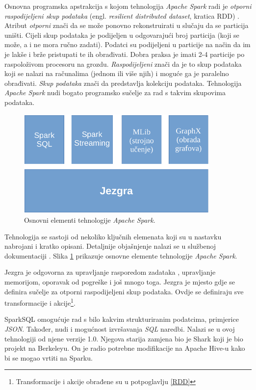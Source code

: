 \documentclass[times, utf8, zavrsni, numeric]{fer}
\begin{document}
Osnovna programska apstrakcija s kojom tehnologija \emph{Apache Spark} radi je \emph{otporni raspodijeljeni skup podataka} (engl. \emph{resilient distributed dataset}, kratica RDD) \cite{workingSets}.
Atribut \emph{otporni} znači da se može ponovno rekonstruirati u slučaju da se particija uništi. Cijeli skup podataka je podijeljen u odgovarajući broj particija (koji se može, a i ne mora ručno zadati). Podatci su podijeljeni u particije na način da im je lakše i brže pristupati te ih obrađivati. Dobra praksa je imati 2-4 particije po raspoloživom procesoru na grozdu. \emph{Raspodijeljeni} znači da je to skup podataka koji se nalazi na računalima (jednom ili više njih) i moguće ga je paralelno obrađivati. \emph{Skup podataka} znači da predstavlja kolekciju podataka. Tehnologija \emph{Apache Spark} nudi bogato programsko sučelje za rad s takvim skupovima podataka.

\vspace{5mm}
\begin{figure}[htb]
\centering
\includegraphics[width=10cm]{img/gradivniElementiCropped.pdf}
\caption{Osnovni elementi tehnologije \emph{Apache Spark}.}
\label{fig:spark-stack}
\end{figure}


Tehnologija se sastoji od nekoliko ključnih elemenata koji su u nastavku nabrojani i kratko opisani. Detaljnije objašnjenje nalazi se u službenoj dokumentaciji \cite{officialDocumentation}. Slika \ref{fig:spark-stack} prikazuje osnovne elemente tehnologije \emph{Apache Spark}.

Jezgra je odgovorna za upravljanje rasporedom zadataka , upravljanje memorijom, oporavak od pogreške i još mnogo toga. Jezgra je mjesto gdje se definira sučelje za otporni raspodijeljeni skup podataka. Ovdje se definiraju sve transformacije i akcije\footnote{Transformacije i akcije obrađene su u potpoglavlju \ref{RDD}}.   

SparkSQL omogućuje rad s bilo kakvim strukturiranim podatcima, primjerice \emph{JSON}. Također, nudi i mogućnost izvršavanja \emph{SQL} naredbi. Nalazi se u ovoj tehnologiji od njene verzije 1.0. Njegova starija zamjena bio je Shark koji je bio projekt na Berkeleyu. On je radio potrebne modifikacije na Apache Hive-u kako bi se mogao vrtiti na Sparku.
\end{document}
